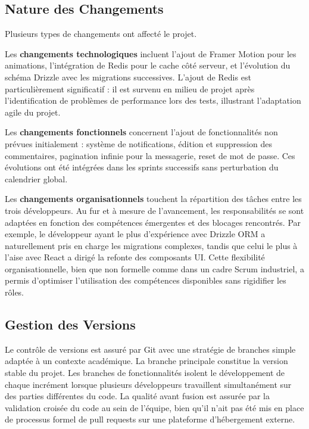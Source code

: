 \subsection{Nature des Changements}

Plusieurs types de changements ont affecté le projet.

Les \textbf{changements technologiques} incluent l'ajout de Framer Motion pour les animations, l'intégration de Redis pour le cache côté serveur, et l'évolution du schéma Drizzle avec les migrations successives. L'ajout de Redis est particulièrement significatif : il est survenu en milieu de projet après l'identification de problèmes de performance lors des tests, illustrant l'adaptation agile du projet.

Les \textbf{changements fonctionnels} concernent l'ajout de fonctionnalités non prévues initialement : système de notifications, édition et suppression des commentaires, pagination infinie pour la messagerie, reset de mot de passe. Ces évolutions ont été intégrées dans les sprints successifs sans perturbation du calendrier global.

Les \textbf{changements organisationnels} touchent la répartition des tâches entre les trois développeurs. Au fur et à mesure de l'avancement, les responsabilités se sont adaptées en fonction des compétences émergentes et des blocages rencontrés. Par exemple, le développeur ayant le plus d'expérience avec Drizzle ORM a naturellement pris en charge les migrations complexes, tandis que celui le plus à l'aise avec React a dirigé la refonte des composants UI. Cette flexibilité organisationnelle, bien que non formelle comme dans un cadre Scrum industriel, a permis d'optimiser l'utilisation des compétences disponibles sans rigidifier les rôles.

\subsection{Gestion des Versions}

Le contrôle de versions est assuré par Git avec une stratégie de branches simple adaptée à un contexte académique. La branche principale constitue la version stable du projet. Les branches de fonctionnalités isolent le développement de chaque incrément lorsque plusieurs développeurs travaillent simultanément sur des parties différentes du code. La qualité avant fusion est assurée par la validation croisée du code au sein de l'équipe, bien qu'il n'ait pas été mis en place de processus formel de pull requests sur une plateforme d'hébergement externe.

